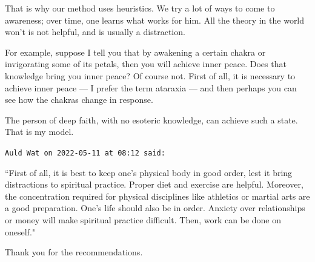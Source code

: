 \begin{footnotesize}
\begin{sffamily}
That is why our method uses heuristics. We try a lot of ways to come to awareness; over time, one learns what works for him. All the theory in the world won't is not helpful, and is usually a distraction.

For example, suppose I tell you that by awakening a certain chakra or invigorating some of its petals, then you will achieve inner peace. Does that knowledge bring you inner peace? Of course not. First of all, it is necessary to achieve inner peace — I prefer the term ataraxia — and then perhaps you can see how the chakras change in response.

The person of deep faith, with no esoteric knowledge, can achieve such a state. That is my model.


\hfill

\texttt{Auld Wat on 2022-05-11 at 08:12 said: }

``First of all, it is best to keep one's physical body in good order, lest it bring distractions to spiritual practice. Proper diet and exercise are helpful. Moreover, the concentration required for physical disciplines like athletics or martial arts are a good preparation. One's life should also be in order. Anxiety over relationships or money will make spiritual practice difficult. Then, work can be done on oneself."

Thank you for the recommendations.


\end{sffamily}\end{footnotesize}
